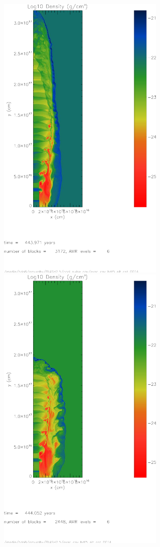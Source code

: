 \begin{figure}[t]
\begin{center}
   \begin{minipage}[t]{.48\linewidth}
\includegraphics[width=8cm]{cool_pulse_cav}
   \end{minipage} \hfill
   \begin{minipage}[t]{.48\linewidth}
\includegraphics[width=8cm]{cool_pulse_cdam}

\end{minipage}
\end{center}
\end{figure}
